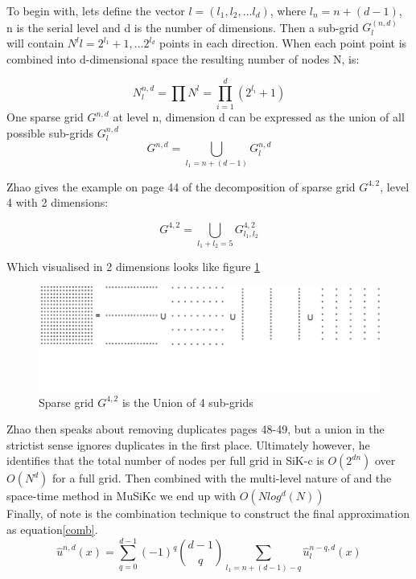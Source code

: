 \documentclass[a4paper]{amsart}
\begin{document}
To begin with, lets define the vector $l = (l_{1}, l_{2}, ... l_{d})$, where $l_{n} = n + (d - 1)$, n is the serial level and d is the number of dimensions. Then a sub-grid $G_{l}^(n,d)$ will contain $N^l{l} = {2^{l_{1}} + 1, ... 2^{l_{d}}}$ points in each direction. When each point point is combined into d-dimensional space the resulting number of nodes N, is:

\begin{equation}
N_{l}^{n,d} = \prod N^{l} = \prod^{d}_{i=1}(2^{l_{i}} + 1)
\label{NMatrix}
\end{equation}
One sparse grid $G^{n,d}$ at level n, dimension d can be expressed as the union of all possible sub-grids $G_{l}^{n,d}$
\begin{equation}
G^{n,d} = \bigcup_{l_{1}=n+(d-1)} G_{l}^{n,d}
\label{SparseGrid}
\end{equation}

Zhao gives the example on page 44 \cite{mski0} of the decomposition of sparse grid $G^{4,2}$, level 4 with 2 dimensions:

\begin{equation}
G^{4,2} = \bigcup_{l_{1}+l_{2} = 5} G^{4,2}_{l_{1},l_{2}}
\end{equation}

Which visualised in 2 dimensions looks like figure \ref{fig:union}
\begin{figure}[h]
\centering
\includegraphics[scale=0.2]{UnionAll.png}
\caption {Sparse grid $G^{4,2}$ is the Union of 4 sub-grids}
\label {fig:union}
\end{figure}

Zhao then speaks about removing duplicates \cite{misk0} pages 48-49, but a union in the strictist sense ignores duplicates in the first place. Ultimately however, he identifies that the total number of nodes per full grid in SiK-c is $O(2^{dn})$ over $O(N^{d})$ for a full grid. Then combined with the multi-level nature of and the space-time method in MuSiKc we end up with $O(Nlog^{d}(N))$\\

Finally, of note is the combination technique to construct the final approximation as equation\ref{comb}.
\begin{equation}
\hat u^{n,d}(x) = \sum^{d-1}_{q=0}(-1)^q \binom{d-1}{q} \sum_{l_{1}=n+(d-1)-q} \hat u_{l}^{n-q,d}(x)
\label{comb}
\end{equation}
\newpage
\end{document}
